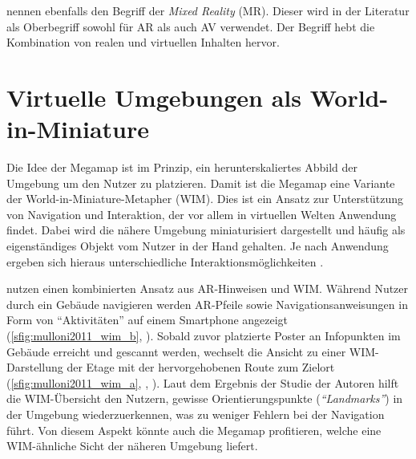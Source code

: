 \textcite{Milgram1994} nennen ebenfalls den Begriff der \emph{Mixed Reality} (MR).
Dieser wird in der Literatur als Oberbegriff sowohl für AR als auch AV verwendet.
Der Begriff hebt die Kombination von realen und virtuellen Inhalten hervor.

\section{Virtuelle Umgebungen als World-in-Miniature}
Die Idee der Megamap ist im Prinzip, ein herunterskaliertes Abbild der Umgebung um den Nutzer zu platzieren.
Damit ist die Megamap eine Variante der World-in-Miniature-Metapher (WIM).
Dies ist ein Ansatz zur Unterstützung von Navigation und Interaktion, der vor allem in virtuellen Welten Anwendung findet.
Dabei wird die nähere Umgebung miniaturisiert dargestellt und häufig als eigenständiges Objekt vom Nutzer in der Hand gehalten.
Je nach Anwendung ergeben sich hieraus unterschiedliche Interaktionsmöglichkeiten \parencite{Stoakley1995}.

\textcites{Mulloni2011a}{Mulloni2012} nutzen einen kombinierten Ansatz aus AR-Hinweisen und WIM.\@
Während Nutzer durch ein Gebäude navigieren werden AR-Pfeile sowie Navigationsanweisungen in Form von \enquote{Aktivitäten} auf einem Smartphone angezeigt (\autoref{sfig:mulloni2011_wim_b}, ).
Sobald zuvor platzierte Poster an Infopunkten im Gebäude erreicht und gescannt werden, wechselt die Ansicht zu einer WIM-Darstellung der Etage mit der hervorgehobenen Route zum Zielort (\autoref{sfig:mulloni2011_wim_a}, , ).
Laut dem Ergebnis der Studie der Autoren hilft die WIM-Übersicht den Nutzern, gewisse Orientierungspunkte (\emph{\enquote{Landmarks}}) in der Umgebung wiederzuerkennen, was zu weniger Fehlern bei der Navigation führt.
Von diesem Aspekt könnte auch die Megamap profitieren, welche eine WIM-ähnliche Sicht der näheren Umgebung liefert.

